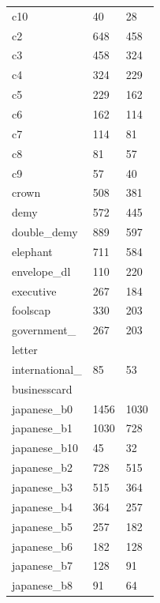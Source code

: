 {\begin{supertabular}{|lll|}
                        c10 &     40 &     28 \\
                         c2 &    648 &    458 \\
                         c3 &    458 &    324 \\
                         c4 &    324 &    229 \\
                         c5 &    229 &    162 \\
                         c6 &    162 &    114 \\
                         c7 &    114 &     81 \\
                         c8 &     81 &     57 \\
                         c9 &     57 &     40 \\
                      crown &    508 &    381 \\
                       demy &    572 &    445 \\
               double\_demy &    889 &    597 \\
                   elephant &    711 &    584 \\
               envelope\_dl &    110 &    220 \\
                  executive &    267 &    184 \\
                   foolscap &    330 &    203 \\
         government\_       &    267 &    203\\
\hfill               letter &        &       \\
international\_             &     85 &     53\\
\hfill         businesscard &        &       \\
               japanese\_b0 &   1456 &   1030 \\
               japanese\_b1 &   1030 &    728 \\
              japanese\_b10 &     45 &     32 \\
               japanese\_b2 &    728 &    515 \\
               japanese\_b3 &    515 &    364 \\
               japanese\_b4 &    364 &    257 \\
               japanese\_b5 &    257 &    182 \\
               japanese\_b6 &    182 &    128 \\
               japanese\_b7 &    128 &     91 \\
               japanese\_b8 &     91 &     64 \\

\end{supertabular}}
